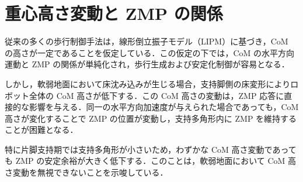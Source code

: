 \section{重心高さ変動と ZMP の関係}

従来の多くの歩行制御手法は，線形倒立振子モデル（LIPM）に基づき，CoM の高さが一定であることを仮定している．この仮定の下では，CoM の水平方向運動と ZMP の関係が単純化され，歩行生成および安定化制御が容易となる．

しかし，軟弱地面において床沈み込みが生じる場合，支持脚側の床変形によりロボット全体の CoM 高さが低下する．この CoM 高さの変動は，ZMP 応答に直接的な影響を与える．同一の水平方向加速度が与えられた場合であっても，CoM 高さが変化することで ZMP の位置が変動し，支持多角形内に ZMP を維持することが困難となる．

特に片脚支持期では支持多角形が小さいため，わずかな CoM 高さ変動であっても ZMP の安定余裕が大きく低下する．このことは，軟弱地面において CoM 高さ変動を無視できないことを示唆している．